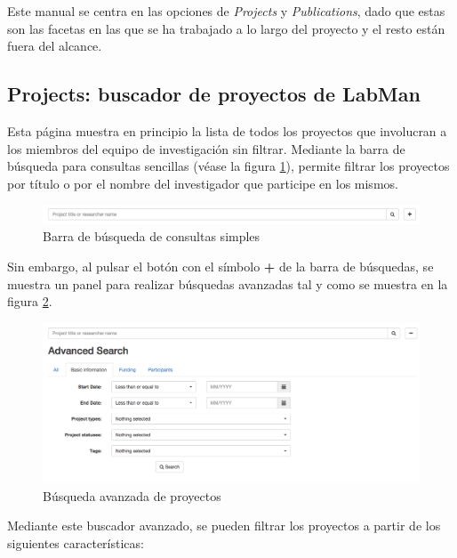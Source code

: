 Este manual se centra en las opciones de \textit{Projects} y \textit{Publications}, dado que estas son las facetas en las que se ha trabajado a lo largo del proyecto y el resto están fuera del alcance.

\subsection{Projects: buscador de proyectos de LabMan}

Esta página muestra en principio la lista de todos los proyectos que involucran a los miembros del equipo de investigación sin filtrar. Mediante la barra de búsqueda para consultas sencillas (véase la figura \ref{fig:project_search_bar}), permite filtrar los proyectos por título o por el nombre del investigador que participe en los mismos.

\begin{figure}[!htbp]
	\centering
	\includegraphics[scale=0.35]{fig/project_search_bar}
	\caption{Barra de búsqueda de consultas simples}
	\label{fig:project_search_bar}
\end{figure}

Sin embargo, al pulsar el botón con el símbolo \textbf{+} de la barra de búsquedas, se muestra un panel para realizar búsquedas avanzadas tal y como se muestra en la figura \ref{fig:projects_advanced_search}.

\begin{figure}[!htbp]
	\centering
	\includegraphics[scale=0.31]{fig/projects_advanced_search}
	\caption{Búsqueda avanzada de proyectos}
	\label{fig:projects_advanced_search}
\end{figure}

Mediante este buscador avanzado, se pueden filtrar los proyectos a partir de los siguientes características:

